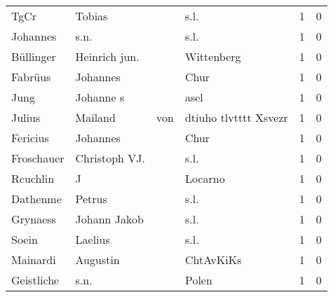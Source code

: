 \begin{tabular}{llllrr}
                     TgCr &                             Tobias &             &                                        s.l. &          1 &         0 \\
                 Johannes &                               s.n. &             &                                        s.l. &          1 &         0 \\
                Büllinger &                      Heinrich jun. &             &                                  Wittenberg &          1 &         0 \\
                  Fabrüus &                           Johannes &             &                                        Chur &          1 &         0 \\
                     Jung &                          Johanne s &             &                                        asel &          1 &         0 \\
                   Julius &                            Mailand &         von &                       dtiuho tlvtttt Xsvezr &          1 &         0 \\
                 Fericius &                           Johannes &             &                                        Chur &          1 &         0 \\
               Froschauer &                      Christoph VJ. &             &                                        s.l. &          1 &         0 \\
                 Rcuchlin &                                  J &             &                                     Locarno &          1 &         0 \\
                 Dathenme &                             Petrus &             &                                        s.l. &          1 &         0 \\
                 Grynaess &                       Johann Jakob &             &                                        s.l. &          1 &         0 \\
                    Soein &                            Laelius &             &                                        s.l. &          1 &         0 \\
                 Mainardi &                           Augustin &             &                                   ChtAvKiKs &          1 &         0 \\
               Geistliche &                               s.n. &             &                                       Polen &          1 &         0 \\

\end{tabular}
